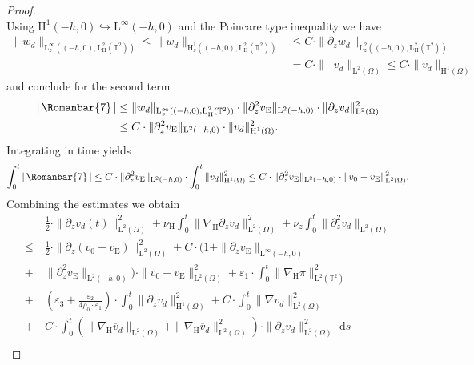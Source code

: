 \documentclass[preprint]{elsarticle}
\numberwithin{equation}{section}
\newcommand {\T}	{\mathbb{T}}
\renewcommand{\d}{\, \mathrm{d}}
\DeclareMathOperator{\divH}{div_{\H}}
\renewcommand{\H}{\mathrm{H}}
\renewcommand{\bar}[1]{\overline{#1}}
\newcommand{\vbar}{\bar{v}}
\newcommand{\nablaH}{\nabla_{\H}}
\newcommand{\rL}{\mathrm{L}}
\newcommand{\rH}{\H}
\newcommand{\rE}{\mathrm{E}}
\newcommand{\VII}{\, \Romanbar{7}\, }
\begin{document}
\begin{proof}
\begin{equation*}
	\end{equation*}
	Using $\rH^1(-h,0) \hookrightarrow \rL^\infty(-h,0)$ and the Poincare type inequality we have
	\begin{align*}
		\| w_d \|_{\rL^\infty_z((-h,0),\rL^2_\rH(\T^2))}
		\leq \| w_d \|_{\rH^1_z((-h,0),\rL^2_\rH(\T^2))}
		&\leq C \cdot \| \partial_z w_d \|_{\rL^2_z((-h,0),\rL^2_\rH(\T^2))} \\
		&= C \cdot \| \divH v_d \|_{\rL^2(\Omega)}
		\leq C \cdot \| v_d \|_{\rH^1(\Omega)} 
	\end{align*}
	and conclude for the second term
	\begin{align*}
		|\VII|
		&\leq \| w_d \|_{\rL^\infty_z((-h,0),\rL^2_\rH(\T^2))}
		\cdot \| \partial_z^2 v_{\rE} \|_{\rL^2(-h,0)}
		\cdot \| \partial_z v_d \|_{\rL^2(\Omega)}^2 \\
		&\leq C \cdot \| \partial_z^2 v_{\rE} \|_{\rL^2(-h,0)} \cdot \| v_d \|_{\rH^1(\Omega)}^2 .
	\end{align*}
	Integrating in time yields
	\begin{equation*}
		\int_0^t |\VII|
		\leq C \cdot \| \partial_z^2 v_{\rE} \|_{\rL^2(-h,0)} \cdot \int_0^t \| v_d \|_{\rH^1(\Omega)}^2 
		\leq  C \cdot \| \partial_z^2 v_{\rE} \|_{\rL^2(-h,0)} \cdot \| v_0 - v_{\rE} \|_{\rL^2(\Omega)}^2 .
	\end{equation*}
	Combining the estimates we obtain
	\begin{equation*}
		\begin{aligned}
			&\frac{1}{2} \cdot \| \partial_z v_d(t) \|_{\rL^2(\Omega)}^2 
			+ \nu_{\rH} \int_0^t \| \nablaH \partial_z v_d \|_{\rL^2(\Omega)}^2+ \nu_z \int_0^t \| \partial_z^2 v_d \|_{\rL^2(\Omega)}
			\\ 
			\leq \ &\frac{1}{2} \cdot \| \partial_z (v_0 - v_{\rE}) \|_{\rL^2(\Omega)}^2
			+ 
			C \cdot (1 + \| \partial_z v_{\rE} \|_{\rL^\infty(-h,0)} \\
			+ \ &\| \partial_z^2 v_{\rE} \|_{\rL^2(-h,0)}) \cdot \| v_0 - v_{\rE} \|_{\rL^2(\Omega)}^2 + \varepsilon_1 \cdot \int_0^t \| \nablaH \pi \|_{\rL^2(\T^2)}^2 \\
			+ \ &\left( \varepsilon_3 + \frac{\varepsilon_2}{4 \rho_0 \cdot \varepsilon_1} \right) \cdot \int_0^t  \| \partial_z v_d\|_{\rH^{1}(\Omega)}^2
			+ C \cdot \int_0^t \| \nabla v_d\|_{\rL^2(\Omega)}^2
			\\
			+ \ &C \cdot \int_0^t (\| \nablaH \vbar_d \|_{\rL^2(\Omega)} + \| \nablaH \vbar_d \|_{\rL^2(\Omega)}^2) \cdot \| \partial_z v_d \|_{\rL^2(\Omega)}^2 \, \d s 
			\\

\end{aligned}
\end{equation*}
\end{proof}
\end{document}
